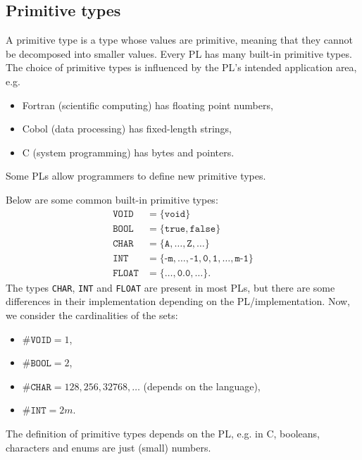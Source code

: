 \documentclass[a4paper, openany]{memoir}
\begin{document}
\subsection{Primitive types}
A primitive type is a type whose values are primitive, meaning that they cannot be decomposed into smaller values. Every PL has many built-in primitive types. The choice of primitive types is influenced by the PL's intended application area, e.g.
\begin{itemize}
    \item Fortran (scientific computing) has floating point numbers,
    \item Cobol (data processing) has fixed-length strings,
    \item C (system programming) has bytes and pointers.
\end{itemize}
Some PLs allow programmers to define new primitive types.

Below are some common built-in primitive types:
\begin{align*}
    \texttt{VOID} &= \{\texttt{void}\} \\
    \texttt{BOOL} &= \{\texttt{true}, \texttt{false}\} \\
    \texttt{CHAR} &= \{\texttt{A}, \dots, \texttt{Z}, \dots \} \\
    \texttt{INT} &= \{\texttt{-m}, \dots, \texttt{-1}, \texttt{0}, \texttt{1}, \dots, \texttt{m-1}\} \\
    \texttt{FLOAT} &= \{\dots, \texttt{0.0}, \dots\}.
\end{align*}
The types \texttt{CHAR}, \texttt{INT} and \texttt{FLOAT} are present in most PLs, but there are some differences in their implementation depending on the PL/implementation. Now, we consider the cardinalities of the sets:
\begin{itemize}
    \item $\#\texttt{VOID} = 1$,
    \item $\#\texttt{BOOL} = 2$,
    \item $\#\texttt{CHAR} = 128, 256, 32768, \dots$ (depends on the language),
    \item $\#\texttt{INT} = 2m$.
\end{itemize}
The definition of primitive types depends on the PL, e.g. in C, booleans, characters and enums are just (small) numbers.
\end{document}
